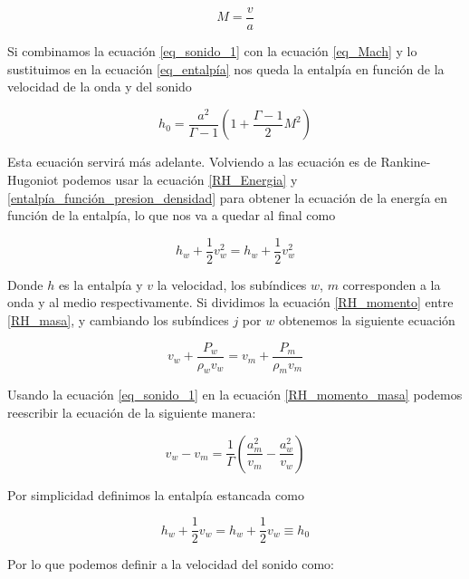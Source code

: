\documentclass[12pt,a4paper]{book}
\begin{document}
\begin{equation} \label{eq_Mach}
	M = \frac{v}{a}
\end{equation}

Si combinamos la ecuación \ref{eq_sonido_1} con la ecuación \ref{eq_Mach} y lo sustituimos en la ecuación \ref{eq_entalpía} nos queda la entalpía en función de la velocidad de la onda y del sonido

\begin{equation} \label{h_0_función_aire_mach}
	h_0 = \frac{a^2}{\Gamma - 1} \left( 1 + \frac{\Gamma - 1}{2} M^2 \right)
\end{equation}

Esta ecuación servirá más adelante. Volviendo a las ecuación  es de Rankine-Hugoniot podemos usar la ecuación  
\ref{RH_Energia} y \ref{entalpía_función_presion_densidad} para obtener la ecuación   de la energía en función de la entalpía, lo que nos va a quedar al final como

\begin{equation}\label{RH_entalpía}
  h_w +\frac{1}{2}v_w^2 = h_w +\frac{1}{2}v_w^2
\end{equation} 

Donde $ h $ es la entalpía y $v$ la velocidad, los subíndices $w$, $m$ corresponden a la onda y al medio respectivamente. Si dividimos la ecuación \ref{RH_momento} entre \ref{RH_masa}, y cambiando los subíndices $j$ por $w$ obtenemos la siguiente ecuación 

\begin{equation} \label{RH_momento_masa}
  v_w + \frac{P_w}{\rho_w v_w} = v_m + \frac{P_m}{\rho_m v_m}
\end{equation}

Usando la ecuación \ref{eq_sonido_1} en la ecuación \ref{RH_momento_masa} podemos reescribir la ecuación de 
la siguiente manera:

\begin{equation} \label{eq_diferencia_velocidades}
  v_w-v_m = \frac{1}{\Gamma} \left(\frac{a_m^2}{v_m} - \frac{a_w^2}{v_w} \right)
\end{equation}

Por simplicidad definimos la entalpía estancada como 

\begin{equation}
  h_w + \frac{1}{2} v_w = h_w + \frac{1}{2} v_w \equiv h_0
\end{equation}

Por lo que podemos definir a la velocidad del sonido como:
\end{document}
